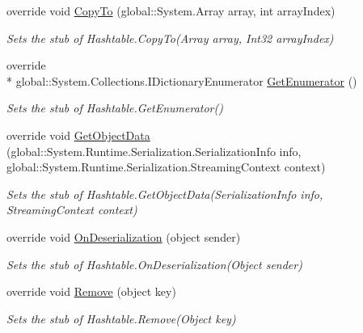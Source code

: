 \begin{DoxyCompactItemize}
override void \hyperlink{class_system_1_1_collections_1_1_fakes_1_1_stub_hashtable_a7383b6949ac8e0179dff6c575d478a8a}{Copy\-To} (global\-::\-System.\-Array array, int array\-Index)
\begin{DoxyCompactList}\small\item\em Sets the stub of Hashtable.\-Copy\-To(\-Array array, Int32 array\-Index)\end{DoxyCompactList}\item 
override \\*
global\-::\-System.\-Collections.\-I\-Dictionary\-Enumerator \hyperlink{class_system_1_1_collections_1_1_fakes_1_1_stub_hashtable_a74c5a19efe644d257167ff0e1328c338}{Get\-Enumerator} ()
\begin{DoxyCompactList}\small\item\em Sets the stub of Hashtable.\-Get\-Enumerator()\end{DoxyCompactList}\item 
override void \hyperlink{class_system_1_1_collections_1_1_fakes_1_1_stub_hashtable_ad3aad41534ed9cad8286f6bb33e779fd}{Get\-Object\-Data} (global\-::\-System.\-Runtime.\-Serialization.\-Serialization\-Info info, global\-::\-System.\-Runtime.\-Serialization.\-Streaming\-Context context)
\begin{DoxyCompactList}\small\item\em Sets the stub of Hashtable.\-Get\-Object\-Data(\-Serialization\-Info info, Streaming\-Context context)\end{DoxyCompactList}\item 
override void \hyperlink{class_system_1_1_collections_1_1_fakes_1_1_stub_hashtable_af372234a43cfe30ecd7139f2c24d9467}{On\-Deserialization} (object sender)
\begin{DoxyCompactList}\small\item\em Sets the stub of Hashtable.\-On\-Deserialization(\-Object sender)\end{DoxyCompactList}\item 
override void \hyperlink{class_system_1_1_collections_1_1_fakes_1_1_stub_hashtable_a2930a9fbf55d5d337db2312151192e7e}{Remove} (object key)
\begin{DoxyCompactList}\small\item\em Sets the stub of Hashtable.\-Remove(\-Object key)\end{DoxyCompactList}\end{DoxyCompactItemize}
